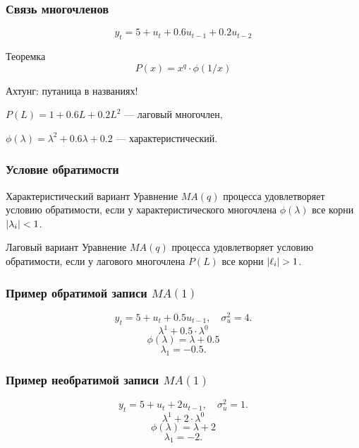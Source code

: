 \begin{frame}
    \frametitle{Связь многочленов}

    \[
        y_t = 5 + u_t + 0.6u_{t-1} + 0.2u_{t-2}
    \]

    \begin{block}{Теоремка}
        \[
        P(x) = x^q \cdot \phi(1/x)    
        \]
    \end{block}

    \pause
    Ахтунг: \alert{путаница} в названиях!

    $P(L)= 1 + 0.6 L + 0.2 L^2$ — \alert{лаговый} многочлен,

    $\phi(\lambda) = \lambda^2 + 0.6 \lambda + 0.2$ — \alert{характеристический}.


\end{frame}



\begin{frame}
    \frametitle{Условие обратимости}

    \begin{block}{Характеристический вариант}
        Уравнение $MA(q)$ процесса удовлетворяет условию обратимости, если 
        у характеристического многочлена $\phi(\lambda)$ все корни $\abs{\lambda_i} <1$.
    \end{block}

    \pause

    \begin{block}{Лаговый вариант}
        Уравнение $MA(q)$ процесса удовлетворяет условию обратимости, если 
        у лагового многочлена $P(L)$ все корни $\abs{\ell_i} >1$.
    \end{block}
    

\end{frame}

\begin{frame}
    \frametitle{Пример обратимой записи $MA(1)$}

    \[
        y_t = 5 + u_t + 0.5 u_{t-1}, \quad \sigma^2_u = 4.
    \]
    \pause
    \[
    \lambda^1 + 0.5 \cdot \lambda^0
    \]    
    \[
    \phi(\lambda) = \lambda + 0.5    
    \]
    \pause
    \[
    \lambda_1 = -0.5.    
    \]

\end{frame}


\begin{frame}
    \frametitle{Пример необратимой записи $MA(1)$}

    \[
        y_t = 5 + u_t + 2 u_{t-1}, \quad \sigma^2_u = 1.
    \]
    \pause
    \[
    \lambda^1 + 2 \cdot \lambda^0
    \]
    \[
    \phi(\lambda) = \lambda + 2    
    \]
    \pause
    \[
    \lambda_1 = -2.    
    \]
\end{frame}


